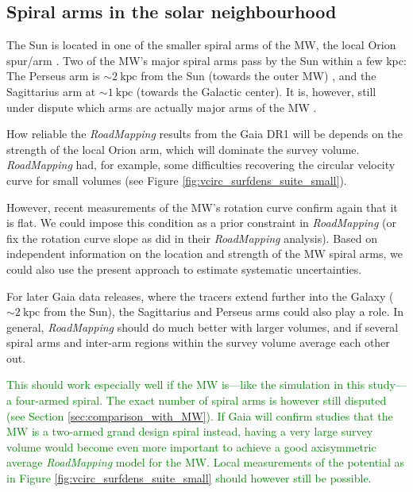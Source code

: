 \documentclass[iop,revtex4,numberedappendix,appendixfloats]{emulateapj}
\newcommand{\RM}{{\sl RoadMapping}}
\newcommand{\NEW}[1]{\textcolor{Green}{#1}}
\begin{document}
\subsection{Spiral arms in the solar neighbourhood} \label{sec:discussion_sun_location}

The Sun is located in one of the smaller spiral arms of the MW, the local Orion spur/arm \citep{1953ApJ...118..318M}. Two of the MW's major spiral arms pass by the Sun within a few kpc: The Perseus arm is $\sim2~\text{kpc}$ from the Sun (towards the outer MW) \citep{2006Sci...311...54X}, and the Sagittarius arm at $\sim1~\text{kpc}$ \citep{2010PASJ...62..287S} (towards the Galactic center). It is, however, still under dispute which arms are actually major arms of the MW \citep{1985IAUS..106..335B,2013ApJ...769...15X,2013ApJ...775...79Z}.

How reliable the \RM{} results from the Gaia DR1 will be depends on the strength of the local Orion arm, which will dominate the survey volume. \RM{} had, for example, some difficulties recovering the circular velocity curve for small volumes (see Figure \ref{fig:vcirc_surfdens_suite_small}).

However, recent measurements of the MW's rotation curve \citep{2012ApJ...759..131B,2014ApJ...783..130R} confirm again that it is flat. We could impose this condition as a prior constraint in \RM{} (or fix the rotation curve slope as \citet{2013ApJ...779..115B} did in their \RM{} analysis). Based on independent information on the location and strength of the MW spiral arms, we could also use the present approach to estimate systematic uncertainties.

For later Gaia data releases, where the tracers extend further into the Galaxy ($\sim2~\text{kpc}$ from the Sun), the Sagittarius and Perseus arms could also play a role. In general, \RM{} should do much better with larger volumes, and if several spiral arms and inter-arm regions within the survey volume average each other out.

\NEW{This should work especially well if the MW is---like the simulation in this study---a four-armed spiral. The exact number of spiral arms is however still disputed (see Section \ref{sec:comparison_with_MW}). If Gaia will confirm studies that the MW is a two-armed grand design spiral instead, having a very large survey volume would become even more important to achieve a good axisymmetric average \RM{} model for the MW. Local measurements of the potential as in Figure \ref{fig:vcirc_surfdens_suite_small} should however still be possible.}
\end{document}
